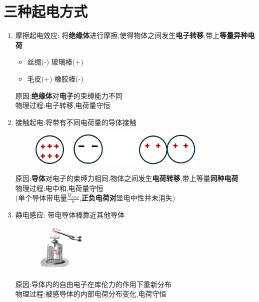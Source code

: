 \documentclass{article}
\begin{document}
    \section{三种起电方式}
    \begin{enumerate}
        \item 摩擦起电效应: 将\textbf{绝缘体}进行摩擦,使得物体之间发生\textbf{电子转移},带上\textbf{等量异种电荷}
            \begin{itemize}[label={}]
                \item 丝绸(-) 玻璃棒(+)   
                \item 毛皮(+) 橡胶棒(-)   
            \end{itemize}
        原因:\textbf{绝缘体}对\textbf{电子}的束缚能力不同   \\
        物理过程:电子转移,电荷量守恒

        \item 接触起电:将带有不同电荷量的导体接触
        \begin{figure}[h]
            \centering
            \includegraphics[width=0.8\textwidth]{./pictures/1.png}
        \end{figure}

        原因:\textbf{导体}对电子的束缚力相同,物体之间发生\textbf{电荷转移},带上等量\textbf{同种电荷}  \\    
        物理过程:电中和,电荷量守恒  \\
        (单个导体带电量$\frac{Q_{total}}{n}$,\textbf{正负电荷对}显电中性并未消失)

        \newpage

        \item 静电感应: 带电导体棒靠近其他导体
        \begin{figure}[h]
            \centering
            \includegraphics[width=0.25\textwidth]{./pictures/2.png}
        \end{figure}

        原因:导体内的自由电子在库伦力的作用下重新分布 \\
        物理过程:被感导体的内部电荷分布变化,电荷守恒        
    \end{enumerate}
\end{document}
